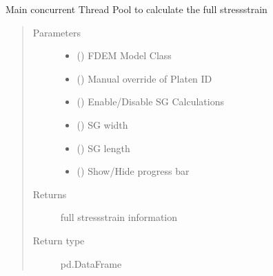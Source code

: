 \documentclass[letterpaper,10pt,english]{sphinxmanual}
\begin{document}

\begin{fulllineitems}
\label{\detokenize{openfdem:openfdem.complete_UCS_thread_pool_generators.main}}
Main concurrent Thread Pool to calculate the full stress\sphinxhyphen{}strain
\begin{quote}\begin{description}
\item[{Parameters}] \leavevmode\begin{itemize}
\item {} 
 ({\hyperref[\detokenize{openfdem:openfdem.openfdem.Model}]{}}) \textendash{} FDEM Model Class

\item {} 
 () \textendash{} Manual override of Platen ID

\item {} 
 () \textendash{} Enable/Disable SG Calculations

\item {} 
 () \textendash{} SG width

\item {} 
 () \textendash{} SG length

\item {} 
 () \textendash{} Show/Hide progress bar

\end{itemize}

\item[{Returns}] \leavevmode
full stress\sphinxhyphen{}strain information

\item[{Return type}] \leavevmode
pd.DataFrame

\end{description}\end{quote}

\end{fulllineitems}
\end{document}
